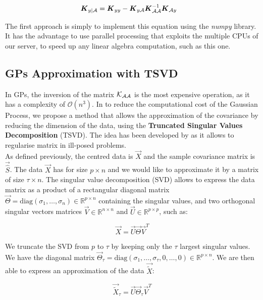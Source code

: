 \begin{align}
    {\boldsymbol{{K}}}_{y | \mathcal{A}} &=  {\boldsymbol{{K}}}_{yy} - {\boldsymbol{{K}}}_{y\mathcal{A}} {\boldsymbol{{K}}}_{\mathcal{A}\mathcal{A}}^{-1} {\boldsymbol{{K}}}_{\mathcal{A} y} 
\end{align}

The first approach is simply to implement this equation using the \textit{numpy} library. It has the advantage to use parallel processing that exploits the multiple CPUs of our server, to speed up any linear algebra computation, such as this one. 

\subsection{GPs Approximation with TSVD}

In GPs, the inversion of the matrix $\mathcal{K}_{\mathcal{A}\mathcal{A}}$ is the most expensive operation, as it has a complexity of $\mathcal{O}(n^3)$. In to reduce the computational cost of the Gaussian Process, we propose a method that allows the approximation of the covariance by reducing the dimension of the data, using the \textbf{Truncated Singular Values Decomposition} (TSVD). The idea has been developed by \citep{hansen_truncatedsvd_1987} as it allows to regularise matrix in ill-posed problems.  \\

As defined previously, the centred data is $\vec{X}$ and the sample covariance matrix is $\vec{\hat{S}}$. The data $\vec{X}$ has for size $p\times n$ and we would like to approximate it by a matrix of size $\tau \times n $. The singular value decomposition (SVD) allows to express the data matrix as a product of a rectangular diagonal matrix $\vec{\Theta} = \text{diag}(\sigma_1, \dots, \sigma_n ) \in \mathbb{R}^{p \times n} $ containing the singular values, and two orthogonal singular vectors matrices $\vec{V} \in \mathbb{R}^{n \times n} $ and $\vec{U} \in \mathbb{R}^{p \times p} $, such as: 

\begin{equation}
    \vec{X} = \vec{U} \vec{\Theta} \vec{V}^T
\end{equation}

We truncate the SVD from $p$ to $\tau$ by keeping only the $\tau$ largest singular values. We have the diagonal matrix $\vec{\Theta}_\tau = \text{diag}(\sigma_1, \dots, \sigma_\tau, 0, \dots, 0 ) \in \mathbb{R}^{p \times n} $. We are then able to express an approximation of the data $\vec{\tilde{X}}$: 

\begin{equation}
    \vec{\tilde{X}}_\tau = \vec{U} \vec{\Theta}_\tau \vec{V}^T
\end{equation}


